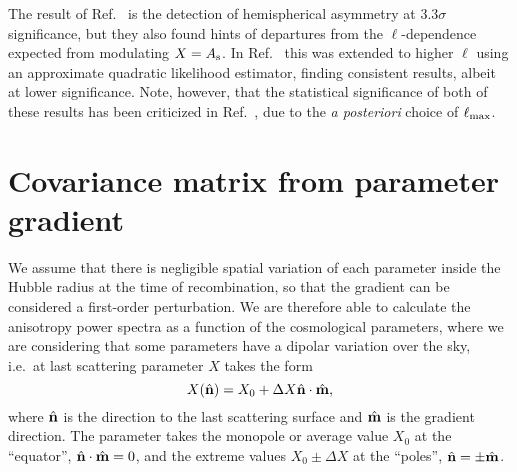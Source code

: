 \documentclass[twocolumn,aps,prd,showpacs]{revtex4}
\def\beq{\begin{equation}}
\def\eeq{\end{equation}}
\begin{document}
The result of Ref.~\cite{Hoftuft:2009rq} is the detection of hemispherical
asymmetry at $3.3\sigma$ significance, but they also found hints of departures
from the $\ell$-dependence expected from modulating $X = A_{\rm s}$.  In
Ref.~\cite{Hanson:2009gu} this was extended to higher $\ell$ using an
approximate quadratic likelihood estimator, finding consistent results, albeit
at lower significance.   Note, however, that the statistical significance of
both of these results has been criticized in Ref.~\cite{Bennett:2010jb},
due to the {\it a posteriori} choice of $\ell_{\rm max}$.




\section{Covariance matrix from parameter gradient}
\label{sec:cov}

We assume that there
is negligible spatial variation of each parameter 
inside the Hubble radius at the time of recombination,
so that the gradient can be 
considered a first-order perturbation.  We are therefore able to
calculate the anisotropy power spectra as a function of the cosmological
parameters, where we are considering that some parameters have a
dipolar variation over the sky, i.e.\ at last scattering parameter $X$ 
takes the form
\beq
X({\hat{\bf{n}}}) = X_0 + \Delta X\hat{\bf{n}}\cdot\hat{\bf{m}},
\eeq
where ${\hat{\bf{n}}}$ is the direction to the last scattering surface and 
${\hat{\bf{m}}}$ is the gradient direction.  The parameter takes the monopole 
or average value $X_0$ at the ``equator'', 
$\hat{\bf{n}}\cdot\hat{\bf{m}} = 0$, and the extreme values $X_0 \pm\Delta X$ 
at the ``poles'', ${\hat{\bf{n}}} = \pm{\hat{\bf{m}}}$.

%
\end{document}
